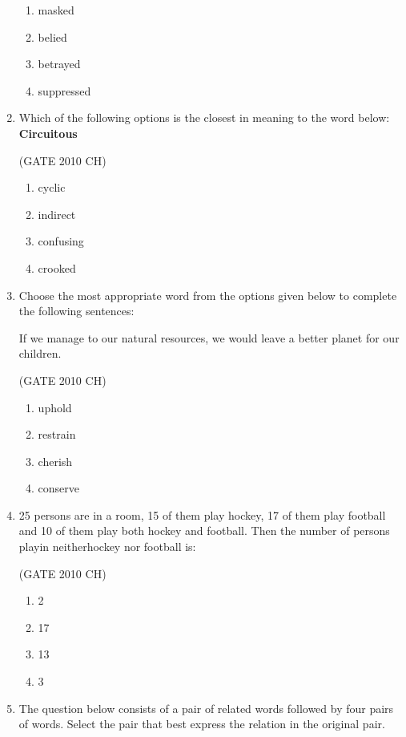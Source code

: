 \documentclass[journal,12pt,onecolumn]{exam}
\theoremstyle{remark}
\begin{document}
\begin{enumerate}
  \begin{enumerate}
      \item masked
      \item belied
      \item betrayed
      \item suppressed
  \end{enumerate}
\item 
 Which of the following options is the closest in meaning to the word below:\\
     \textbf{Circuitous}
   
    \hfill{(GATE 2010 CH)}\\
 
 \begin{enumerate}
     \item cyclic
     \item indirect
     \item confusing
     \item crooked
 \end{enumerate}
\item 
 Choose the most appropriate word from the options given below to complete the following sentences:

  If we manage to \makebox[3cm]{\hrulefill} our natural resources, we would leave a better planet for our children.

\hfill{(GATE 2010 CH)}\\

\begin{enumerate}
    \item uphold
    \item restrain
    \item cherish
    \item conserve
\end{enumerate}
\item
 25 persons are in a room, 15 of them play hockey, 17 of them play football and 10 of them play both hockey and football. Then the number of persons playin neitherhockey nor football is:

 \hfill{(GATE 2010 CH)}\\

 \begin{enumerate}
     \item 2
     \item 17
     \item 13
     \item 3
     
 \end{enumerate}
\item
  The question below consists of a pair of related words followed by four pairs of words. Select the pair that best express the relation in the original pair.\\
 

\end{enumerate}
\end{document}
